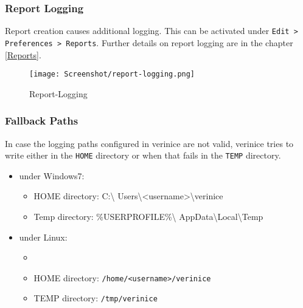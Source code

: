 \documentclass[a4paper,10pt]{book}
\begin{document}
\subsubsection{Report Logging}
\label{sec:report-logging}

Report creation causes additional logging.  This can be activated
under \texttt{Edit > Preferences > Reports}. Further details on report
logging are in the chapter \ref{Reports}.

\begin{figure}[ht]
  \centering
  \texttt{[image: Screenshot/report-logging.png]}
  \caption{Report-Logging}
  \label{fig:report-logging}
\end{figure}

\subsubsection{Fallback Paths}
\label{sec:fallback-path}

In case the logging paths configured in verinice are not valid,
verinice tries to write either in the \texttt{HOME} directory or when
that fails in the \texttt{TEMP} directory.

\begin{itemize}
\item under Windows7:
  \begin{itemize}
  \item HOME directory: C:\textbackslash
    Users\textbackslash<username>\textbackslash verinice
  \item Temp directory: \%USERPROFILE\%\textbackslash
    AppData\textbackslash Local\textbackslash Temp
  \end{itemize}
\item  under Linux:
  \begin{itemize}
  \item \item HOME directory: \texttt{/home/<username>/verinice}
  \item TEMP directory: \texttt{/tmp/verinice}
  \end{itemize}

\end{itemize}
\end{document}
